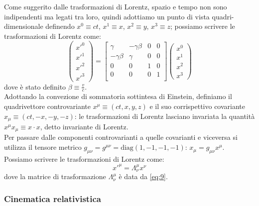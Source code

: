 \documentclass[]{article}
\begin{document}
Come suggerito dalle trasformazioni di Lorentz, spazio e tempo non sono indipendenti ma legati tra loro, quindi adottiamo un punto di vista quadri-dimensionale definendo $ x^0 \equiv ct $, $ x^1 \equiv x $, $ x^2 \equiv y $, $ x^3 \equiv z $; possiamo scrivere le trasformazioni di Lorentz come:
\begin{equation}
	\begin{pmatrix}
		x'^0 \\ x'^1 \\ x'^2 \\ x'^3
	\end{pmatrix}
	=
	\begin{bmatrix}
		\gamma & -\gamma\beta & 0 & 0 \\ 
		-\gamma\beta & \gamma & 0 & 0 \\ 
		0 & 0 & 1 & 0 \\ 
		0 & 0 & 0 & 1 \\ 
	\end{bmatrix}
	\begin{pmatrix}
		x^0 \\ x^1 \\ x^2 \\ x^3 
	\end{pmatrix}
	\label{eq:9}
\end{equation}
dove è stato definito $ \beta\equiv\frac{v}{c} $. \\ 
%
Adottando la convezione di sommatoria sottintesa di Einstein, definiamo il quadrivettore controvariante $ x^{\mu} \equiv (ct, x, y, z) $ e il suo corrispettivo covariante $ x_{\mu} \equiv (ct, -x, -y, -z) $: le trasformazioni di Lorentz lasciano invariata la quantità $ x^{\mu}x_{\mu} \equiv x\cdot x$, detto invariante di Lorentz. \\ 
%
Per passare dalle componenti controvarianti a quelle covarianti e viceversa si utilizza il tensore metrico $ g_{\mu\nu} = g^{\mu\nu} = \text{diag}(1,-1,-1,-1) $: $ x_{\mu} = g_{\mu\nu}x^{\mu} $. \\ 
Possiamo scrivere le trasformazioni di Lorentz come:
\begin{equation}
	x'^{\mu} = \Lambda^{\mu}_{\nu} x^{\nu}
	\label{eq:10}
\end{equation}
dove la matrice di trasformazione $ \Lambda^{\mu}_{\nu} $ è data da \ref{eq:9}.

\subsubsection{Cinematica relativistica}
\end{document}
